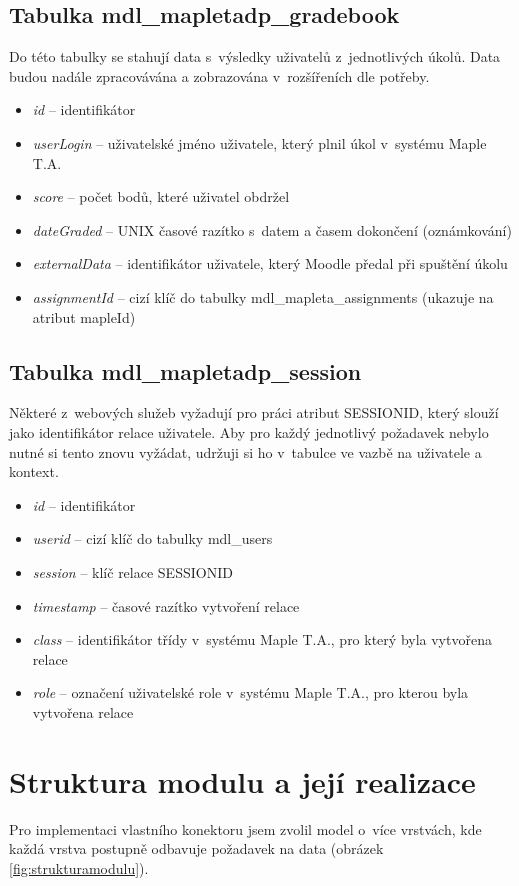 \documentclass[
print,
  11pt,
  table,   
  nolof,    
  nolot,
  oneside,final
]{fithesis3}
\begin{document}
\subsection*{Tabulka mdl\_mapletadp\_gradebook}
Do této tabulky se stahují data s~výsledky uživatelů z~jednotlivých úkolů. Data budou nadále zpracovávána a zobrazována v~rozšířeních dle potřeby.
\begin{itemize}
	\item \textit{id} -- identifikátor
	\item \textit{userLogin} -- uživatelské jméno uživatele, který plnil úkol v~systému Maple T.A.
	\item \textit{score} -- počet bodů, které uživatel obdržel
	\item \textit{dateGraded} --  UNIX časové razítko s~datem a časem dokončení (oznámkování)
	\item \textit{externalData} -- identifikátor uživatele, který Moodle předal při spuštění úkolu
	\item \textit{assignmentId} --   cizí klíč do tabulky mdl\_mapleta\_assignments (ukazuje na atribut mapleId)
\end{itemize}

\subsection*{Tabulka mdl\_mapletadp\_session}
Některé z~webových služeb vyžadují pro práci atribut SESSIONID, který slouží jako identifikátor relace uživatele. Aby pro každý jednotlivý požadavek nebylo nutné si tento znovu vyžádat, udržuji si ho v~tabulce ve vazbě na uživatele a kontext. 
\begin{itemize}
	\item \textit{id} -- identifikátor
	\item \textit{userid} -- cizí klíč do tabulky mdl\_users
	\item \textit{session} -- klíč relace SESSIONID
	\item \textit{timestamp} -- časové razítko vytvoření relace
	\item \textit{class} -- identifikátor třídy v~systému Maple T.A., pro který byla vytvořena relace
	\item \textit{role} -- označení uživatelské role v~systému Maple T.A., pro kterou byla vytvořena relace
\end{itemize}
	\section{Struktura modulu a její realizace}
Pro implementaci vlastního konektoru jsem zvolil model o~více vrstvách, kde každá vrstva postupně odbavuje požadavek na data (obrázek \ref{fig:strukturamodulu}).
\end{document}
